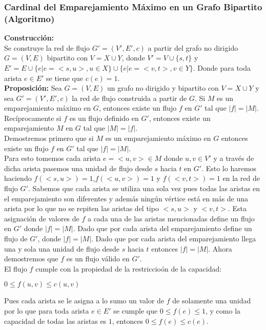 \documentclass[12pt,a4paper]{report}
\begin{document}
\subsubsection{\cite{eda2}Cardinal del Emparejamiento Máximo en un Grafo Bipartito (Algoritmo)}\label{D2} 
\textbf{Construcci\'on:}\\
Se construye la red de flujo $G'=(V',E',c)$ a partir del grafo no dirigido $G=(V,E)$ bipartito con $V=X \cup Y$, donde $V'=V \cup \{s,t\}$ y $E'=E \cup \{e|e=<s,u>,u \in X\} \cup \{e|e=<v,t>,v \in Y\}$. Donde para toda arista $e \in E'$ se tiene que $c(e)=1$.\\
\newline
\textbf{Proposici\'on:} Sea $G=(V,E)$ un grafo no dirigido y bipartito con $V=X \cup Y$ y sea $G'=(V',E',c)$ la red de flujo construida a partir de $G$. Si $M$ es un emparejamiento m\'aximo en $G$, entonces existe un flujo $f$ en $G'$ tal que $|f|=|M|$. Rec\'iprocamente si $f$ es un flujo definido en $G'$, entonces existe un emparejamiento $M$ en $G$ tal que $|M|=|f|$.\\
\newline
Demostremos primero que si $M$ es un emparejamiento m\'aximo en $G$ entonces existe un flujo $f$ en $G'$ tal que $|f|=|M|$.\\\newline
Para esto tomemos cada arista $e=<u,v> \in M$ donde $u,v \in V'$ y a trav\'es de dicha arista pasemos una unidad de flujo desde $s$ hacia $t$ en $G'$. Esto lo haremos haciendo $f(<s,u>)=1$,$f(<u,v>)=1$ y $f(<v,t>)=1$ en la red de flujo $G'$. Sabemos que cada arista se utiliza una sola vez pues todas las aristas en el emparejamiento son diferentes y adem\'as ning\'un v\'ertice est\'a en m\'as de una arista por lo que no se repiten las aristas del tipo $<s,u>$ y $<v,t>$. Esta asignaci\'on de valores de $f$ a cada una de las aristas mencionadas define un flujo en $G'$ donde $|f|=|M|$. Dado que por cada arista del emparejamiento define un flujo de $G'$, donde $|f|=|M|$. Dado que por cada arista del emparejamiento llega una y sola una unidad de flujo desde $s$ hacia $t$ entonces $|f|=|M|$. Ahora demostremos que $f$ es un flujo v\'alido en $G'$.\\
\newline
El flujo $f$ cumple con la propiedad de la restriccio\'on de la capacidad:
 \begin{center}
$0 \leq f(u,v) \leq c(u,v)$
\end{center}
Pues cada arista se le asigna a lo sumo un valor de $f$ de solamente una unidad por lo que para toda arista $e \in E'$ se cumple que $0 \leq f(e) \leq 1$, y como la capacidad de todas las aristas es $1$, entonces $0 \leq f(e) \leq c(e)$.\\
\end{document}
